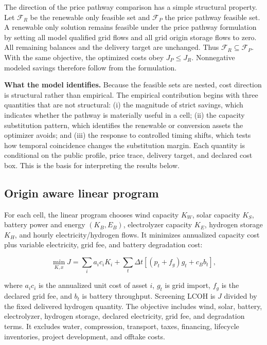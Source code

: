\documentclass[largeformat]{interact}
\begin{document}
The direction of the price pathway comparison has a simple structural
property. Let \(\mathcal{F}_R\) be the renewable only feasible set and
\(\mathcal{F}_P\) the price pathway feasible set. A renewable only
solution remains feasible under the price pathway formulation by setting
all model qualified grid flows and all grid origin storage flows to
zero. All remaining balances and the delivery target are unchanged. Thus
\(\mathcal{F}_R\subseteq\mathcal{F}_P\). With the same objective, the
optimized costs obey \(J_P\leq J_R\). Nonnegative modeled savings
therefore follow from the formulation.

\textbf{What the model identifies.} Because the feasible sets are
nested, cost direction is structural rather than empirical. The
empirical contribution begins with three quantities that are not
structural: (i) the magnitude of strict savings, which indicates whether
the pathway is materially useful in a cell; (ii) the capacity
substitution pattern, which identifies the renewable or conversion
assets the optimizer avoids; and (iii) the response to controlled timing
shifts, which tests how temporal coincidence changes the substitution
margin. Each quantity is conditional on the public profile, price trace,
delivery target, and declared cost box. This is the basis for
interpreting the results below.

\subsection{Origin aware linear
program}\label{origin-aware-linear-program}

For each cell, the linear program chooses wind capacity \(K_W\), solar
capacity \(K_S\), battery power and energy \((K_B,E_B)\), electrolyzer
capacity \(K_E\), hydrogen storage \(K_H\), and hourly
electricity/hydrogen flows. It minimizes annualized capacity cost plus
variable electricity, grid fee, and battery degradation cost:

\[
\min_{K,x} J=\sum_i a_i c_iK_i+\sum_t\Delta t\left[(p_t+f_g)g_t+c_Bb_t\right],
\]

where \(a_i c_i\) is the annualized unit cost of asset \(i\), \(g_t\) is
grid import, \(f_g\) is the declared grid fee, and \(b_t\) is battery
throughput. Screening LCOH is \(J\) divided by the fixed delivered
hydrogen quantity. The objective includes wind, solar, battery,
electrolyzer, hydrogen storage, declared electricity, grid fee, and
degradation terms. It excludes water, compression, transport, taxes,
financing, lifecycle inventories, project development, and offtake
costs.
\end{document}
